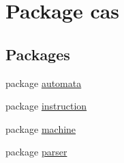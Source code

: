\hypertarget{namespacecas}{\section{Package cas}
\label{namespacecas}
}
\subsection*{Packages}
\begin{DoxyCompactItemize}
\item 
package \hyperlink{namespacecas_1_1automata}{automata}
\item 
package \hyperlink{namespacecas_1_1instruction}{instruction}
\item 
package \hyperlink{namespacecas_1_1machine}{machine}
\item 
package \hyperlink{namespacecas_1_1parser}{parser}
\end{DoxyCompactItemize}
